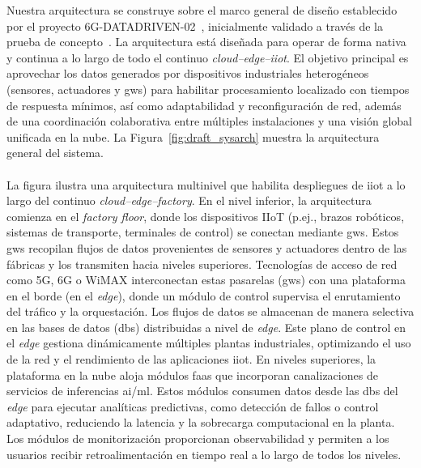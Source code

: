 Nuestra arquitectura se construye sobre el marco general de diseño establecido por el proyecto 6G-\allowbreak DATADRIVEN-02~\cite{6g-datadriven-arch}, inicialmente validado a través de la prueba de concepto~\cite{carrascal2025softwarized}. La arquitectura está diseñada para operar de forma nativa y continua a lo largo de todo el continuo \textit{cloud–edge–\gls{iiot}}. El objetivo principal es aprovechar los datos generados por dispositivos industriales heterogéneos (sensores, actuadores y \glspl{gw}) para habilitar procesamiento localizado con tiempos de respuesta mínimos, así como adaptabilidad y reconfiguración de red, además de una coordinación colaborativa entre múltiples instalaciones y una visión global unificada en la nube. La Figura~\ref{fig:draft_sysarch} muestra la arquitectura general del sistema.\\
\\
La figura ilustra una arquitectura multinivel que habilita despliegues de \gls{iiot} a lo largo del continuo \textit{cloud–edge–factory}. En el nivel inferior, la arquitectura comienza en el \textit{factory floor}, donde los dispositivos IIoT (p.ej., brazos robóticos, sistemas de transporte, terminales de control) se conectan mediante \glspl{gw}. Estos \glspl{gw} recopilan flujos de datos provenientes de sensores y actuadores dentro de las fábricas y los transmiten hacia niveles superiores. Tecnologías de acceso de red como 5G, 6G o WiMAX interconectan estas pasarelas (\glspl{gw}) con una plataforma en el borde (en el \textit{edge}), donde un módulo de control supervisa el enrutamiento del tráfico y la orquestación. Los flujos de datos se almacenan de manera selectiva en las bases de datos (\glspl{db}) distribuidas a nivel de \textit{edge}. Este plano de control en el \textit{edge} gestiona dinámicamente múltiples plantas industriales, optimizando el uso de la red y el rendimiento de las aplicaciones \gls{iiot}. En niveles superiores, la plataforma en la nube aloja módulos \gls{faas} que incorporan canalizaciones de servicios de inferencias \gls{ai}/\gls{ml}. Estos módulos consumen datos desde las \glspl{db} del \textit{edge} para ejecutar analíticas predictivas, como detección de fallos o control adaptativo, reduciendo la latencia y la sobrecarga computacional en la planta. Los módulos de monitorización proporcionan observabilidad y permiten a los usuarios recibir retroalimentación en tiempo real a lo largo de todos los niveles.


